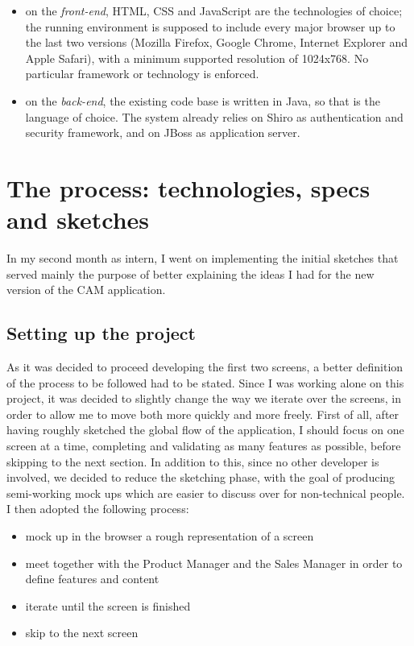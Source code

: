 \documentclass[12pt,svgnames]{memoir}
\begin{document}
\begin{itemize}
\itemsep1pt\parskip0pt
\item
  on the \emph{front-end}, HTML, CSS and JavaScript are the technologies
  of choice; the running environment is supposed to include every major
  browser up to the last two versions (Mozilla Firefox, Google Chrome,
  Internet Explorer and Apple Safari), with a minimum supported
  resolution of 1024x768. No particular framework or technology is
  enforced.
\item
  on the \emph{back-end}, the existing code base is written in Java, so
  that is the language of choice. The system already relies on Shiro as
  authentication and security framework, and on JBoss as application
  server.
\end{itemize}

\chapter{The process: technologies, specs and
sketches}\label{the-process-technologies-specs-and-sketches}

In my second month as intern, I went on implementing the initial
sketches that served mainly the purpose of better explaining the ideas I
had for the new version of the CAM application.

\section{Setting up the project}\label{setting-up-the-project}

As it was decided to proceed developing the first two screens, a better
definition of the process to be followed had to be stated. Since I was
working alone on this project, it was decided to slightly change the way
we iterate over the screens, in order to allow me to move both more
quickly and more freely. First of all, after having roughly sketched the
global flow of the application, I should focus on one screen at a time,
completing and validating as many features as possible, before skipping
to the next section. In addition to this, since no other developer is
involved, we decided to reduce the sketching phase, with the goal of
producing semi-working mock ups which are easier to discuss over for
non-technical people. I then adopted the following process:

\begin{itemize}
\itemsep1pt\parskip0pt
\item
  mock up in the browser a rough representation of a screen
\item
  meet together with the Product Manager and the Sales Manager in order
  to define features and content
\item
  iterate until the screen is finished
\item
  skip to the next screen
\end{itemize}
\end{document}
